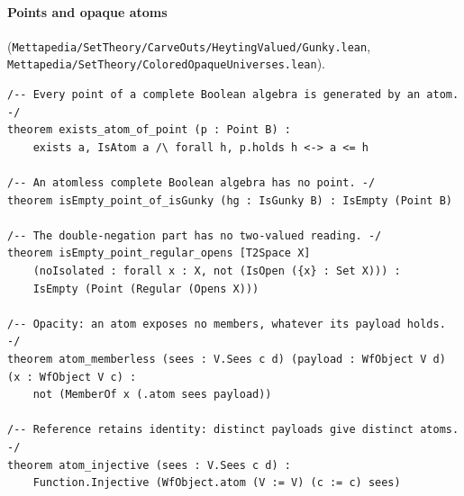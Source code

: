 \documentclass[]{article}
\theoremstyle{definition}
\theoremstyle{remark}
\newcommand{\lpath}[1]{{\ttfamily\nolinkurl{#1}}}
\begin{document}
\paragraph{Points and opaque atoms} (\lpath{Mettapedia/SetTheory/CarveOuts/HeytingValued/Gunky.lean},
\lpath{Mettapedia/SetTheory/ColoredOpaqueUniverses.lean}).
\begin{lstlisting}
/-- Every point of a complete Boolean algebra is generated by an atom. -/
theorem exists_atom_of_point (p : Point B) :
    exists a, IsAtom a /\ forall h, p.holds h <-> a <= h

/-- An atomless complete Boolean algebra has no point. -/
theorem isEmpty_point_of_isGunky (hg : IsGunky B) : IsEmpty (Point B)

/-- The double-negation part has no two-valued reading. -/
theorem isEmpty_point_regular_opens [T2Space X]
    (noIsolated : forall x : X, not (IsOpen ({x} : Set X))) :
    IsEmpty (Point (Regular (Opens X)))

/-- Opacity: an atom exposes no members, whatever its payload holds. -/
theorem atom_memberless (sees : V.Sees c d) (payload : WfObject V d) (x : WfObject V c) :
    not (MemberOf x (.atom sees payload))

/-- Reference retains identity: distinct payloads give distinct atoms. -/
theorem atom_injective (sees : V.Sees c d) :
    Function.Injective (WfObject.atom (V := V) (c := c) sees)
\end{lstlisting}
\end{document}

